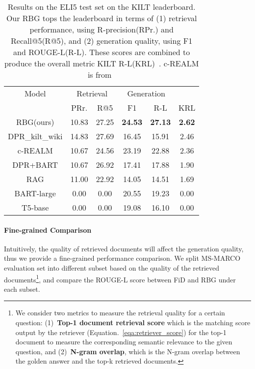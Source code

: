 \documentclass[11pt]{article}
\begin{document}
\begin{table}[!ht]
\resizebox{0.47\textwidth}{!}
{

\begin{tabular}{c|ccccc}
\hline
Model           & \multicolumn{2}{c}{Retrieval} & \multicolumn{2}{c}{Generation} &      \\
                & PRr.       & R@5        & F1           & R-L          & KRL  \\ \hline
RBG(ours)       & 10.83         & 27.25         & \textbf{24.53 }         & \textbf{27.13}         & \textbf{2.62} \\
DPR\_kilt\_wiki &        14.83       &   27.69            &      16.45          &       15.91        &    2.46  \\
c-REALM  &        10.67       &      24.56         &        23.19        &      22.88         &   2.36   \\
DPR+BART        &    10.67           &       26.92        &       17.41         &        17.88       &  1.90    \\
RAG             &        11.00       &      22.92         &      14.05          &      14.51         &   1.69   \\
BART-large      &          0.00     &         0.00     &     20.55            &    19.23            &     0.00  \\ 
T5-base         &      0.00         &       0.00        &       19.08         &      16.10         &   0.00   \\
\hline
\end{tabular}

}
\caption{Results on the ELI5 test set on the KILT leaderboard. Our RBG tops the leaderboard in terms of (1) retrieval performance, using R-precision(RPr.) and Recall@5(R@5), and (2) generation quality, using F1 and ROUGE-L(R-L). These scores are combined to produce the overall metric KILT R-L(KRL)~\cite{petroni2021kilt}. c-REALM is from~\cite{krishna2021hurdles}}
\label{leaderboard}
\vspace{-10pt}
\end{table}

\paragraph{Fine-grained Comparison} Intuitively, the quality of retrieved documents will affect the generation quality, thus we provide a fine-grained performance comparison. We split MS-MARCO evaluation set into different subset based on the quality of the retrieved documents\footnote{\label{foot:retrieve} We consider two metrics to measure the retrieval quality for a certain question: (1)~\textbf{Top-1 document retrieval score} which is the matching score output by the retriever (Equation.~\ref{eqa:retriever_score}) for the top-1 document to measure the corresponding semantic relevance to the given question, and (2)~\textbf{N-gram overlap}, which is the N-gram overlap between the golden answer and the top-k retrieved documents.}, and compare the ROUGE-L score between FiD and RBG under each subset.
\end{document}
